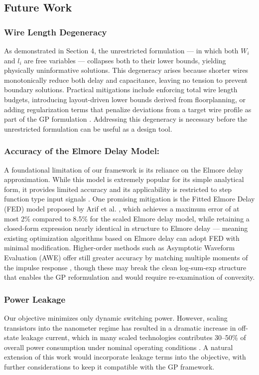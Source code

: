 \documentclass{article}
\begin{document}
\subsection{Future Work}
\subsubsection{Wire Length Degeneracy}
	As demonstrated in Section 4, the unrestricted formulation — in which both $W_i$ and $l_i$ are free variables — collapses both to their lower bounds, yielding physically uninformative solutions. This degeneracy arises because shorter wires monotonically reduce both delay and capacitance, leaving no tension to prevent boundary solutions. Practical mitigations include enforcing total wire length budgets, introducing layout-driven lower bounds derived from floorplanning, or adding regularization terms that penalize deviations from a target wire profile as part of the GP formulation \cite{gp}. Addressing this degeneracy is necessary before the unrestricted formulation can be useful as a design tool.	
\subsubsection{Accuracy of the Elmore Delay Model:} 
	A foundational limitation of our framework is its reliance on the Elmore delay approximation. While this model is extremely popular for its simple analytical form, it provides limited accuracy and its applicability is restricted to step function type input signals \cite{elmore}. 
One promising mitigation is the Fitted Elmore Delay (FED) model proposed by Arif et al. \cite{fed}, which achieves a maximum error of at most 2\% compared to 8.5\% for the scaled Elmore delay model, while retaining a closed-form expression nearly identical in structure to Elmore delay — meaning existing optimization algorithms based on Elmore delay can adopt FED with minimal modification. 
Higher-order methods such as Asymptotic Waveform Evaluation (AWE) offer still greater accuracy by matching multiple moments of the impulse response \cite{elmore}, though these may break the clean log-sum-exp structure that enables the GP reformulation and would require re-examination of convexity.
\subsubsection{Power Leakage}
	Our objective minimizes only dynamic switching power. However, scaling transistors into the nanometer regime has resulted in a dramatic increase in off-state leakage current, which in many scaled technologies contributes 30–50\% of overall power consumption under nominal operating conditions \cite{cmos}. A natural extension of this work would incorporate leakage terms into the objective, with further considerations to keep it compatible with the GP framework.


\printbibliography
\end{document}
